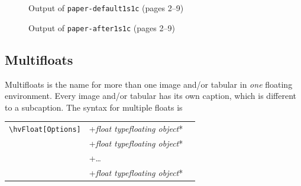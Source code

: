 \documentclass[twoside,paper=a4]{scrartcl}
\makeatletter
\def\Lcs#1{\texttt{\textbackslash#1}\index{#1@\texttt{\textbackslash#1}}}
\newenvironment{BDef}
  {\begin{lrbox}{\boxdef}
      \def\arraystretch{1.0}
      \begin{tabular}{@{}l@{}l@{}l@{}}}
  {\end{tabular}\end{lrbox}
%
%
   {\BCmd\fbox{\usebox\boxdef}\endBCmd}
   \aftergroup\@afterindentfalse\aftergroup\@afterheading
  }
\def\OptArgs{\colorbox{black!20}{\texttt{[Options]}}\kern1pt}
\def\OptArg{\@ifnextchar*\OptArg@i{\OptArg@ii*}}%
\def\OptArg@i*#1{\colorbox{black!20}{\texttt{#1}}\kern1pt}
\def\OptArg@ii*#1{\colorbox{black!20}{\texttt{[#1]}}\kern1pt}
\newcommand\Larg [1]{{\normalfont\itshape#1\/}}
\newcommand\Largb[1]{\lcb\Larg{#1}\rcb}          %
\DeclareRobustCommand\lcb{{\normalfont\ttfamily\textbraceleft}}
\DeclareRobustCommand\rcb{{\normalfont\ttfamily\textbraceright}}
\makeatother
\begin{document}
\begin{figure}[!h]
\hfill
{}\hfill
{}\hfill
{}

\hfill
{}\hfill
{}\hfill
{}
\caption{Output of \texttt{paper-default1s1c} (pages 2--9)}\label{paper-default1s1c}
\end{figure}

\begin{figure}[!h]
\hfill
{}\hfill
{}\hfill
{}

\hfill
{}\hfill
{}\hfill
{}
\caption{Output of \texttt{paper-after1s1c} (pages 2--9)}\label{paper-after1s1c}
\end{figure}


\FloatBarrier



\subsection{Multifloats}\label{sec:multifloats}
Multifloats is the name for more than one image and/or tabular in \emph{one} floating
environment. Every image and/or tabular has its own caption, which is different to
a subcaption. The syntax for multiple floats is

\begin{BDef}
\Lcs{hvFloat}\OptArgs&+\Largb{float type}\Largb{floating object}\OptArg{short caption}\Largb{long caption}\Largb{label}\\
&+\Largb{float type}\Largb{floating object}\OptArg{short caption}\Largb{long caption}\Largb{label}\\
&+\ldots\\
&+\Largb{float type}\Largb{floating object}\OptArg{short caption}\Largb{long caption}\Largb{label}
\end{BDef}
\end{document}

